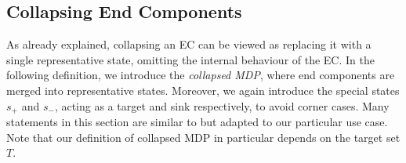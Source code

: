 \documentclass{theoretics}
\newcommand{\targetstate}{s_+}
\newcommand{\sinkstate}{s_-}
\newcommand{\targetset}{T}
\begin{document}
\subsection{Collapsing End Components} \label{sec:brtdp:collapsing}
As already explained, collapsing an EC can be viewed as replacing it with a single representative state, omitting the internal behaviour of the EC.
In the following definition, we introduce the \emph{collapsed MDP}, where end components are merged into representative states.
Moreover, we again introduce the special states $\targetstate$ and $\sinkstate$, acting as a target and sink respectively, to avoid corner cases.
Many statements in this section are similar to \cite[Section~6.4]{de1997formal} but adapted to our particular use case.
Note that our definition of collapsed MDP in particular depends on the target set $\targetset$.
\end{document}
